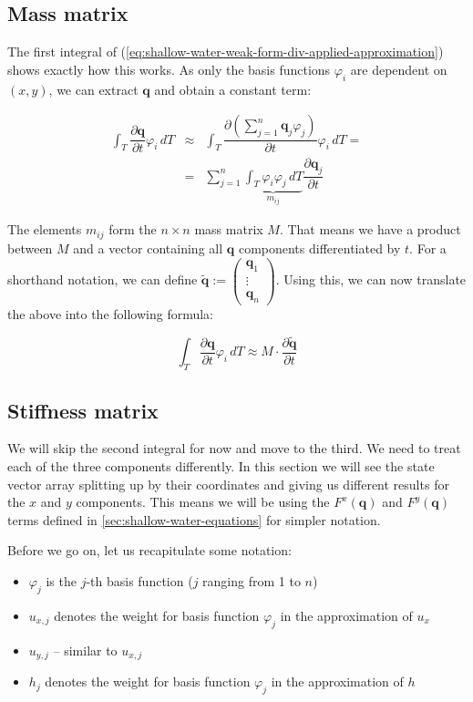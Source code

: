 \documentclass{article}
\newcommand{\pd}[2]{\dfrac{\partial #1}{\partial #2}}
\renewcommand{\phi}{\varphi}
\begin{document}
\subsection{Mass matrix}
\label{sec:mass-matrix}

The first integral of (\ref{eq:shallow-water-weak-form-div-applied-approximation}) shows exactly how this works. As only the basis functions $\phi_i$ are dependent on $(x,y)$, we can extract $\mathbf{q}$ and obtain a constant term:

\begin{eqnarray*}
  \int_T \pd {\mathbf{q}}{t} \phi_i \, dT & \approx &
  \int_T \pd {\left( \sum_{j=1}^n \mathbf{q}_j \phi_j \right) }{t} \phi_i \, dT = \\
  & = & \sum_{j=1}^n \underbrace{\int_T \phi_i \phi_j \, dT}_{m_{ij}} \pd{\mathbf{q}_j}{t}
\end{eqnarray*}

The elements $m_{ij}$ form the $n \times n$ mass matrix $M$. That means we have a product between $M$ and a vector containing all $\mathbf{q}$ components differentiated by $t$. For a shorthand notation, we can define $\tilde{\mathbf{q}} := \begin{pmatrix} \mathbf{q}_1 \\ \vdots \\ \mathbf{q}_n \end{pmatrix}$. Using this, we can now translate the above into the following formula:

\begin{equation*}
  \int_T \pd {\mathbf{q}}{t} \phi_i \, dT \approx
  M \cdot \pd{
    \tilde{\mathbf{q}}}{t}
\end{equation*}

\subsection{Stiffness matrix}
\label{sec:stiffness-matrix}

We will skip the second integral for now and move to the third. We need to treat each of the three components differently. In this section we will see the state vector array splitting up by their coordinates and giving us different results for the $x$ and $y$ components. This means we will be using the $F^x\left(\mathbf{q}\right)$ and $F^y\left(\mathbf{q}\right)$ terms defined in \ref{sec:shallow-water-equations} for simpler notation.

Before we go on, let us recapitulate some notation:
\begin{itemize}
\item $\phi_j$ is the $j$-th basis function ($j$ ranging from 1 to $n$)
\item $u_{x,j}$ denotes the weight for basis function $\phi_j$ in the approximation of $u_x$
\item $u_{y,j}$ -- similar to $u_{x,j}$
\item $h_j$ denotes the weight for basis function $\phi_j$ in the approximation of $h$
\end{itemize}
\end{document}

